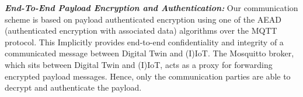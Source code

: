 \textbf{\textit{End-To-End Payload Encryption and Authentication:}}
Our communication scheme is based on payload authenticated encryption using one of the AEAD (authenticated encryption with associated data) algorithms over the MQTT protocol. This Implicitly provides end-to-end confidentiality and integrity of a communicated message between Digital Twin and (I)IoT. The Mosquitto broker, which sits between Digital Twin and (I)IoT,  acts as a proxy for forwarding encrypted payload messages. Hence, only the communication parties are able to decrypt and authenticate the payload. 

